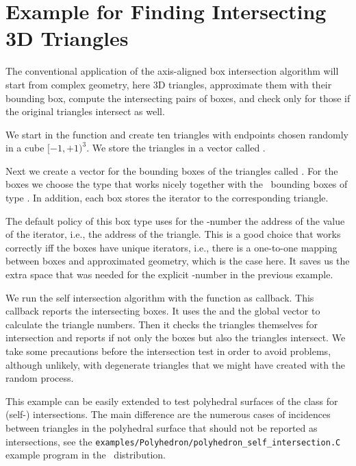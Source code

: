

\section{Example for Finding Intersecting 3D Triangles}

The conventional application of the axis-aligned box intersection
algorithm will start from complex geometry, here 3D triangles,
approximate them with their bounding box, compute the intersecting
pairs of boxes, and check only for those if the original triangles
intersect as well.

We start in the  function and create ten triangles with
endpoints chosen randomly in a cube $[-1,+1)^3$. We store the
triangles in a vector called .

Next we create a vector for the bounding boxes of the triangles called
. For the boxes we choose the type
 that works nicely together
with the \cgal\ bounding boxes of type . In
addition, each box stores the iterator to the corresponding triangle.

The default policy of this box type uses for the -number the 
address of the value of the iterator, i.e., the address of the
triangle. This is a good choice that works correctly iff the boxes
have unique iterators, i.e., there is a one-to-one mapping between
boxes and approximated geometry, which is the case here. It saves us
the extra space that was needed for the explicit -number in
the previous example.

We run the self intersection algorithm with the 
function as callback. This callback reports the intersecting boxes. It
uses the  and the global  vector to
calculate the triangle numbers. Then it checks the triangles
themselves for intersection and reports if not only the boxes but also
the triangles intersect. We take some precautions before the
intersection test in order to avoid problems, although unlikely, with
degenerate triangles that we might have created with the random
process.

This example can be easily extended to test polyhedral surfaces of the
 class for (self-) intersections. The main
difference are the numerous cases of incidences between triangles in
the polyhedral surface that should not be reported as intersections,
see the \texttt{examples/Polyhedron/polyhedron\_self\_intersection.C}
example program in the \cgal\ distribution. 

